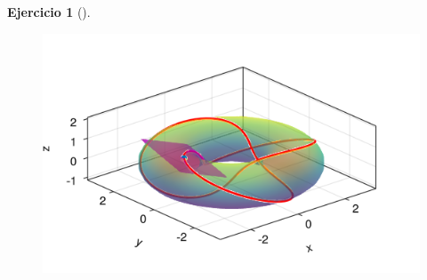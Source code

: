 \documentclass[
  a4paper,
]{scrreport}
\theoremstyle{definition}
\newtheorem{exercise}{Ejercicio}[chapter]
\theoremstyle{remark}
\begin{document}
\begin{exercise}[]
\begin{tcolorbox}
\begin{figure}[H]
{\centering \includegraphics{08-funciones-vectoriales_files/figure-pdf/cell-17-output-1.png}

}

\end{figure}

\end{tcolorbox}

\end{exercise}
\end{document}
